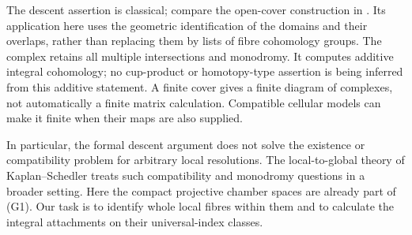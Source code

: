 The descent assertion is classical; compare the open-cover
construction in \cite[Section~4G]{hatcher}. Its application here uses the
geometric identification of the domains and their overlaps, rather
than replacing them by lists of fibre cohomology groups.
The complex retains all multiple intersections and monodromy.
It computes additive integral cohomology; no cup-product or
homotopy-type assertion is being inferred from this additive
statement. A finite cover gives a finite diagram of complexes,
not automatically a finite matrix calculation. Compatible cellular
models can make it finite when their maps are also supplied.

In particular, the formal descent argument does not solve the
existence or compatibility problem for arbitrary local resolutions.
The local-to-global theory of Kaplan--Schedler
\cite{kaplanschedler} treats such compatibility and monodromy
questions in a broader setting. Here the compact projective
chamber spaces are already part of (G1). Our task is to identify
whole local fibres within them and to calculate the integral
attachments on their universal-index classes.
